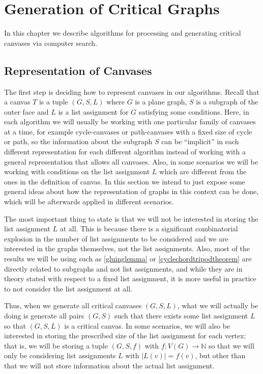 \chapter{Generation of Critical Graphs}

In this chapter we describe algorithms for processing and generating critical canvases via computer search.

\section{Representation of Canvases}

The first step is deciding how to represent canvases in our algorithms. Recall that a canvas $T$ is a tuple 
$(G, S, L)$ where $G$ is a plane graph, $S$ is a subgraph of the outer face and $L$ is a list assignment for 
$G$ satisfying some conditions. Here, in each algorithm we will usually be working with one particular family of 
canvases at a time, for example cycle-canvases or path-canvases with a fixed size of cycle or path, so the 
information about the subgraph $S$ can be ``implicit'' in each different representation for each different algorithm
instead of working with a general representation that allows all canvases. Also, in some scenarios we will be 
working with conditions on the list assignment $L$ which are different from the ones in the definition of canvas.
In this section we intend to just expose some general ideas about how the representation of graphs in this context
can be done, which will be afterwards applied in different scenarios.

The most important thing to state is that we will not be interested in storing the list assignment $L$ at all. 
This is because there is a significant combinatorial explosion in the number of list assignments to be considered and
we are interested in the graphs themselves, not the list assignments. Also, most of the results
we will be using such as \ref{gluinglemma} or \ref{cyclechordtripodtheorem} are directly related to subgraphs
and not list assignments, and while they are in theory stated with respect to a fixed list assignment, it is more
useful in practice to not consider the list assignment at all. 

Thus, when we generate all critical canvases $(G, S, L)$, what we will actually be doing is generate all pairs $(G, S)$ 
such that there exists some list assignment $L$  so that $(G, S, L)$ is a critical canvas. In some scenarios, we will also
be interested in storing the prescribed size of the list assignment for each vertex: that is, we will be storing a tuple $(G, S, f)$
with $f : V(G) \rightarrow \mathbb{N}$ so that we will only be considering list assignments $L$ with $|L(v)| = f(v)$, but other
than that we will not store information about the actual list assignment. 

